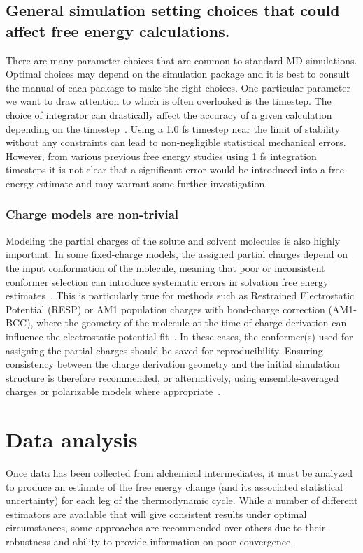 \documentclass[9pt,bestpractices]{livecoms}
\begin{document}
\subsection{General simulation setting choices that could affect free energy calculations.}
There are many parameter choices that are common to standard MD simulations. Optimal choices may depend on the simulation package and it is best to consult the manual of each package to make the right choices. One particular parameter we want to draw attention to which is often overlooked is the timestep. The choice of integrator can drastically affect the accuracy of a given calculation depending on the timestep~\cite{leimkuhler2016efficient}. Using a 1.0 fs timestep near the limit of stability without any constraints can lead to non-negligible statistical mechanical errors. However, from various previous free energy studies using 1 fs integration timesteps it is not clear that a significant error would be introduced into a free energy estimate and may warrant some further investigation.  

\subsubsection{Charge models are non-trivial}
Modeling the partial charges of the solute and solvent molecules is also highly important. In some fixed-charge models, the assigned partial charges depend on the input conformation of the molecule, meaning that poor or inconsistent conformer selection can introduce systematic errors in solvation free energy estimates~\cite{jakalian2000, jambeck2003}. This is particularly true for methods such as Restrained Electrostatic Potential (RESP)\cite{bayly1993resp} or AM1 population charges with bond-charge correction (AM1-BCC)\cite{jakalian2000}, where the geometry of the molecule at the time of charge derivation can influence the electrostatic potential fit~\cite{basma2001, zhang2011, dupradeau2010, osato2025}. In these cases, the conformer(s) used for assigning the partial charges should be saved for reproducibility. Ensuring consistency between the charge derivation geometry and the initial simulation structure is therefore recommended, or alternatively, using ensemble-averaged charges or polarizable models where appropriate~\cite{ren2002,lemkul2016}.

\section{Data analysis}
\label{sec:data_analysis}
Once data has been collected from alchemical intermediates, it must be analyzed to produce an estimate of the free energy change (and its associated statistical uncertainty) for each leg of the thermodynamic cycle.
While a number of different estimators are available that will give consistent results under optimal circumstances, some approaches are recommended over others due to their robustness and ability to provide information on poor convergence.
\end{document}
